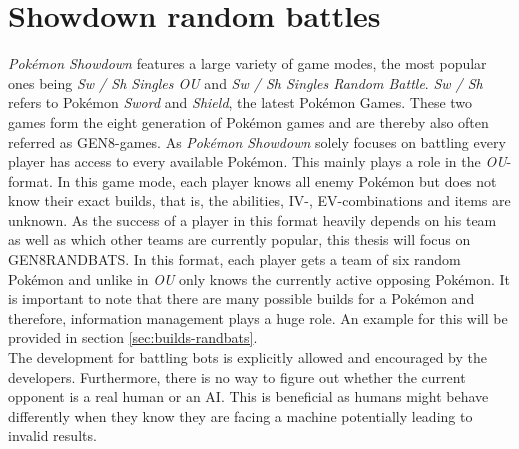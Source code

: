 \section{Showdown random battles}
\label{sec:showdown-background}
\textit{Pokémon Showdown} features a large variety of game modes, the most popular ones being \textit{Sw / Sh Singles OU} and
\textit{Sw / Sh Singles Random Battle}. \textit{Sw / Sh} refers to Pokémon \textit{Sword} and \textit{Shield}, the latest
Pokémon Games. These two games form the eight generation of Pokémon games and are thereby also often referred as 
\ac{GEN8}-games. As \textit{Pokémon Showdown} solely focuses
on battling every player has access to every available Pokémon. This mainly plays a role in the \textit{OU}-format.
In this game mode, each player knows all enemy Pokémon but does not know their exact builds, that is, the abilities,
\ac{IV}-, \ac{EV}-combinations and items are unknown. As the success of a player in this format heavily depends
on his team as well as which other teams are currently popular, this thesis will focus on \ac{GEN8RANDBATS}. In this 
format, each player gets a team of six random Pokémon and unlike in \textit{OU} only knows the currently active
opposing Pokémon. It is important to note that there are many possible builds for a Pokémon and therefore, information
management plays a huge role. An example for this will be provided in section \ref{sec:builds-randbats}. \\
The development for battling bots is explicitly allowed and encouraged by the developers. Furthermore, there is 
no way to figure out whether the current opponent is a real human or an AI. This is beneficial as humans
might behave differently when they know they are facing a machine potentially leading to invalid results. 

\label{sec:showdown-randbats}
